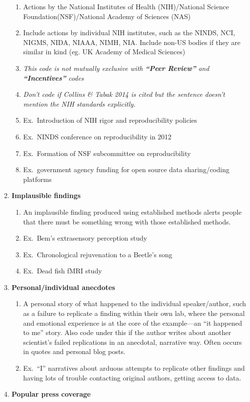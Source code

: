 \documentclass[
]{scrartcl}
\begin{document}
\begin{enumerate}
  \begin{enumerate}

  \item
    Actions by the National Institutes of Health (NIH)/National Science
    Foundation(NSF)/National Academy of Sciences (NAS)
  \item
    Include actions by individual NIH institutes, such as the NINDS,
    NCI, NIGMS, NIDA, NIAAA, NIMH, NIA. Include non-US bodies if they
    are similar in kind (eg. UK Academy of Medical Sciences)
  \item
    \emph{This code is not mutually exclusive with \textbf{``Peer
    Review''} and \textbf{``Incentives''} codes}
  \item
    \emph{Don't code if Collins \& Tabak 2014 is cited but the sentence
    doesn't mention the NIH standards explicitly.}
  \item
    Ex.~Introduction of NIH rigor and reproducibility policies
  \item
    Ex.~NINDS conference on reproducibility in 2012
  \item
    Ex.~Formation of NSF subcommittee on reproducibility
  \item
    Ex.~government agency funding for open source data sharing/coding
    platforms
  \end{enumerate}
\item
  \textbf{Implausible findings}

  \begin{enumerate}

  \item
    An implausible finding produced using established methods alerts
    people that there must be something wrong with those established
    methods.
  \item
    Ex.~Bem's extrasensory perception study
  \item
    Ex.~Chronological rejuvenation to a Beetle's song
  \item
    Ex.~Dead fish fMRI study
  \end{enumerate}
\item
  \textbf{Personal/individual anecdotes}

  \begin{enumerate}

  \item
    A personal story of what happened to the individual speaker/author,
    such as a failure to replicate a finding within their own lab, where
    the personal and emotional experience is at the core of the
    example---an ``it happened to me'' story. Also code under this if
    the author writes about another scientist's failed replications in
    an anecdotal, narrative way. Often occurs in quotes and personal
    blog posts.
  \item
    Ex.~``I'' narratives about arduous attempts to replicate other
    findings and having lots of trouble contacting original authors,
    getting access to data.
  \end{enumerate}
\item
  \textbf{Popular press coverage}


\end{enumerate}
\end{document}
